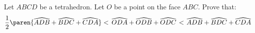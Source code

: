 Let $ABCD$ be a tetrahedron.
Let $O$ be a point on the face $ABC$.
Prove that:
\begin{equation*}
 \frac{1}{2} \paren{\widehat{ADB} + \widehat{BDC} + \widehat{CDA}}
 < \mspace{3mu}  \widehat{ODA} + \widehat{ODB} + \widehat{ODC}  \mspace{2mu}
 < \mspace{2mu}  \widehat{ADB} + \widehat{BDC} + \widehat{CDA}
\end{equation*}
